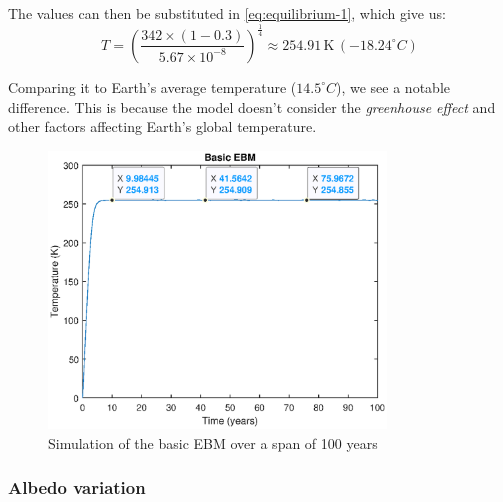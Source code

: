 \documentclass[12pt]{article}
\begin{document}
\noindent The values can then be substituted in \ref{eq:equilibrium-1}, which give us:
\begin{equation}
    T = \left( \frac{342 \times (1 - 0.3)}{5.67 \times 10^{-8}} \right)^{\frac{1}{4}} \approx 254.91 \, \text{K} \, ({-18.24}^\circ C)
\end{equation}

Comparing it to Earth's average temperature (${14.5}^\circ C$), we see a notable difference. This is because the model doesn't consider the \textit{greenhouse effect} and other factors affecting Earth's global temperature.

\begin{figure}[!hbt]
    \centering
    \includegraphics[width=0.8\textwidth]{images/ebm_basic.eps}
    \caption{Simulation of the basic EBM over a span of 100 years}
    \label{fig:basic_ebm}
\end{figure}


\subsubsection{Albedo variation}
\end{document}

